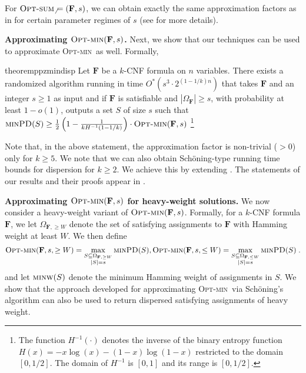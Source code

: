 \documentclass[11pt, letterpaper]{article}
\theoremstyle{definition}
\newcommand{\f}{\mathbf{F}}
\newcommand{\Om}{\Omega_{\f}}
\newcommand{\PD}{\textsc{minPD}}
\newcommand{\w}{\textsc{minw}}
\newcommand{\opts}{\textsc{Opt-sum}}
\newcommand{\optm}{\textsc{Opt-min}}
\newcommand{\sch}{Sch\"{o}ning\xspace}
\begin{document}
For $\opts_\neq(\f,s)$, we can obtain exactly the same approximation factors as in  for certain parameter regimes of $s$ (see  for more details). 

\medskip\noindent
\textbf{Approximating $\optm(\f,s)$.} Next, we show that our techniques can be used to approximate \optm\ as well. Formally,

\begin{restatable}[PPZ approximating $\optm(\f,s)$]{theorem}{ppzmindisp} \label{thm:ppz-for-mindisp}
    Let $\f$ be a $k$-CNF formula on $n$ variables. There exists a randomized algorithm running in time $O^*\left(s^3 \cdot 2^{(1-1/k)n}\right)$ that takes $\f$ and an integer $s \geq 1$ as input and if $\f$ is satisfiable and $|\Om| \geq s$, with probability at least $1-o(1)$, outputs a set $S$ of size $s$ such that $\PD(S) \geq \frac{1}{2} \left(1-\frac{1}{kH^{-1}(1-1/k)}\right) \cdot \optm(\f,s)$ \footnote{The function $H^{-1}(\cdot)$ denotes the inverse of the binary entropy function $H(x)= -x \log(x)-(1-x) \log(1-x) $ restricted to the domain $[0,1/2]$. The domain of $H^{-1}$ is $[0,1]$ and its range is $[0,1/2]$.} 
    
\end{restatable}
Note that, in the above statement, the approximation factor is non-trivial ($>0$) only for $k \geq 5$. We note that we can also obtain \sch-type running time bounds for dispersion for $k \geq 2$. We achieve this by extending . The statements of our results and their proofs appear in . 

\medskip\noindent
\textbf{Approximating $\optm(\f,s)$  for heavy-weight solutions.} We now consider a heavy-weight variant of  $\optm(\f,s)$. Formally, for a $k$-CNF formula $\f$, we let $\Omega_{\f,\geq W}$ denote the set of satisfying assignments to $\f$ with Hamming weight at least $W$. We then define $$\optm(\f,s,\geq W) = \max_{\substack{S \subseteq \Omega_{\f,\geq W}\\|S|=s}} \PD(S), \optm(\f,s,\leq W) = \max_{\substack{S \subseteq \Omega_{\f,\leq W}\\|S|=s}} \PD(S) \; .$$
and let $\w(S)$ denote the minimum Hamming weight of assignments in $S$. We show that the approach developed for approximating \optm\ via \sch's algorithm can also be used to return dispersed satisfying assignments of heavy weight. 
\end{document}
